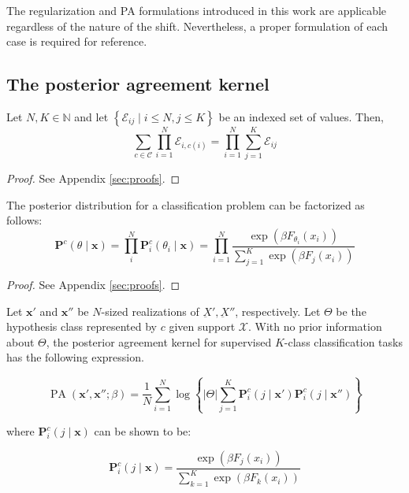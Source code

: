 The regularization and PA formulations introduced in this work are applicable 
regardless of the nature of the shift. Nevertheless, a proper formulation of each
case is required for reference.

\subsection{The posterior agreement kernel}

\begin{lemma}[Exchangeability]\label{lemma:exchangeability} 
    Let $N, K \in \mathbb{N}$ and let $\left\{\mathcal{E}_{i j} \mid i \leq N, j \leq K\right\}$ be an indexed set of values. Then,
    $$
    \sum_{c \in \mathcal{C}} \prod_{i=1}^N \mathcal{E}_{i, c(i)}=\prod_{i=1}^N \sum_{j=1}^K \mathcal{E}_{i j}
    $$
\end{lemma}

\begin{proof}
    See Appendix \ref{sec:proofs}.
\end{proof}

\begin{theorem}\label{theorem:posterior_factorization}

    The posterior distribution for a classification problem can be factorized as follows:
    $$
    \mathbf{P}^c(\theta \mid \bm{x}) = \prod_i^N  \mathbf{P}_i^c(\theta_i \mid \bm{x}) = \prod_{i=1}^N \frac{\exp \left ( \beta F_{\theta_i}(x_i) \right )}{\sum_{j=1}^K \exp \left ( \beta F_j(x_i) \right )}
    $$
\end{theorem}

\begin{proof}
    See Appendix \ref{sec:proofs}.
\end{proof}

\begin{theorem}
    Let $\bm{x}'$ and $\bm{x}''$ be $N$-sized realizations of $\underbar{X}', \underbar{X}''$, respectively.
    Let $\Theta$ be the hypothesis class represented by $c$ given support $\mathcal{X}$.
    With no prior information about $\Theta$, the posterior agreement kernel
    for supervised $K$-class classification tasks has the following expression.

    $$
    \operatorname{PA}\left(\bm{x}', \bm{x}'' ; \beta\right)=\frac{1}{N} \sum_{i=1}^N \log \left\{|\Theta| \sum_{j =1}^K \mathbf{P}_i^c\left(j \mid \bm{x}' \right) \mathbf{P}_i^c \left( j \mid \bm{x}'' \right)\right\}
    $$

    where $\mathbf{P}_i^c(j \mid \bm{x})$ can be shown to be:

    $$
    \mathbf{P}_i^c\left(j \mid \bm{x}\right)=\frac{\exp\left(\beta F_{j}(x_i)\right)}{\sum_{k=1}^K\exp\left(\beta F_k(x_i)\right)}
    $$
\end{theorem}

